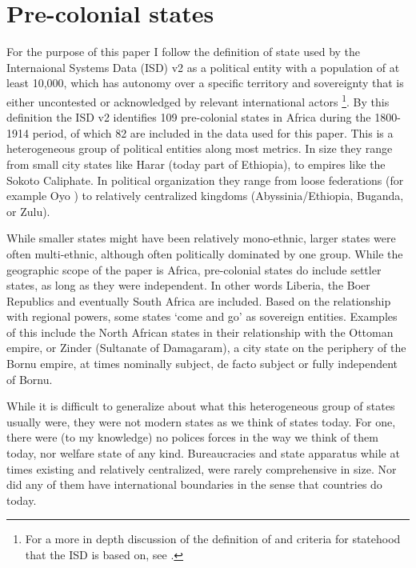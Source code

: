 \documentclass[12pt]{article}
\begin{document}

\section{Pre-colonial states}

For the purpose of this paper I follow the definition of state used by the
Internaional Systems Data (ISD) v2 \citep{Butcher2020} as a political entity
with a population of at least 10,000, which has autonomy over a specific
territory and sovereignty that is either uncontested or acknowledged by relevant
international actors \citep{Butcher2020}\footnote{For a more in depth discussion
of the definition of and criteria for statehood that the ISD is based on, see
\citet{Butcher2017}.}. By this definition the ISD v2 identifies 109 pre-colonial
states in Africa during the 1800-1914 period, of which 82 are included in the
data used for this paper. This is a heterogeneous group of political entities
along most metrics. In size they range from small city states like Harar (today
part of Ethiopia), to empires like the Sokoto Caliphate. In political
organization they range from loose federations (for example Oyo \citep{Law1977})
to relatively centralized kingdoms (Abyssinia/Ethiopia, Buganda, or Zulu).

While smaller states might have been relatively mono-ethnic, larger states were
often multi-ethnic, although often politically dominated by one group. While the
geographic scope of the paper is Africa, pre-colonial states do include settler
states, as long as they were independent. In other words Liberia, the Boer
Republics and eventually South Africa are included. Based on the relationship
with regional powers, some states `come and go' as sovereign entities. Examples
of this include the North African states in their relationship with the Ottoman
empire, or Zinder (Sultanate of Damagaram), a city state on the periphery of the
Bornu empire, at times nominally subject, de facto subject or fully independent
of Bornu.

While it is difficult to generalize about what this heterogeneous group of
states usually were, they were not modern states as we think of states today.
For one, there were (to my knowledge) no polices forces in the way we think of
them today, nor welfare state of any kind. Bureaucracies and state apparatus
while at times existing and relatively centralized, were rarely comprehensive in
size. Nor did any of them have international boundaries in the sense that
countries do today. 
\end{document}

